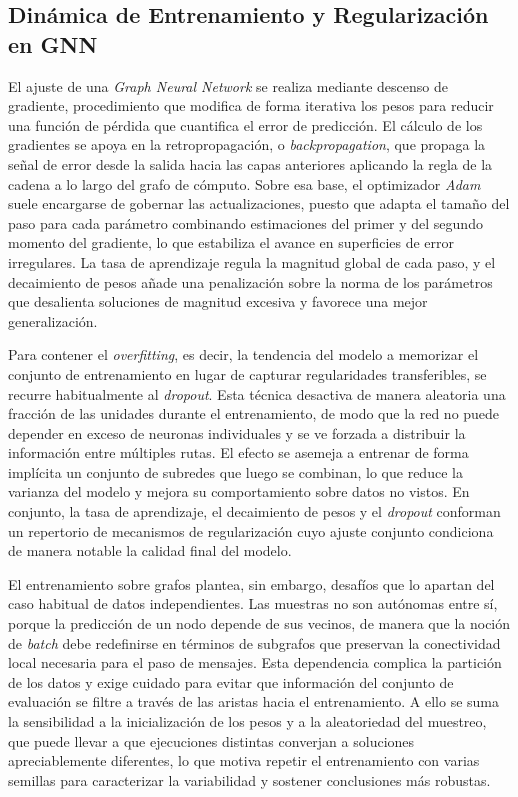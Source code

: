 \subsection{Dinámica de Entrenamiento y Regularización en GNN}

El ajuste de una \textit{Graph Neural Network} se realiza mediante descenso de gradiente, procedimiento que modifica de forma iterativa los pesos para reducir una función de pérdida que cuantifica el error de predicción. El cálculo de los gradientes se apoya en la retropropagación, o \textit{backpropagation}, que propaga la señal de error desde la salida hacia las capas anteriores aplicando la regla de la cadena a lo largo del grafo de cómputo. Sobre esa base, el optimizador \textit{Adam} suele encargarse de gobernar las actualizaciones, puesto que adapta el tamaño del paso para cada parámetro combinando estimaciones del primer y del segundo momento del gradiente, lo que estabiliza el avance en superficies de error irregulares. La tasa de aprendizaje regula la magnitud global de cada paso, y el decaimiento de pesos añade una penalización sobre la norma de los parámetros que desalienta soluciones de magnitud excesiva y favorece una mejor generalización.

Para contener el \textit{overfitting}, es decir, la tendencia del modelo a memorizar el conjunto de entrenamiento en lugar de capturar regularidades transferibles, se recurre habitualmente al \textit{dropout}. Esta técnica desactiva de manera aleatoria una fracción de las unidades durante el entrenamiento, de modo que la red no puede depender en exceso de neuronas individuales y se ve forzada a distribuir la información entre múltiples rutas. El efecto se asemeja a entrenar de forma implícita un conjunto de subredes que luego se combinan, lo que reduce la varianza del modelo y mejora su comportamiento sobre datos no vistos. En conjunto, la tasa de aprendizaje, el decaimiento de pesos y el \textit{dropout} conforman un repertorio de mecanismos de regularización cuyo ajuste conjunto condiciona de manera notable la calidad final del modelo.

El entrenamiento sobre grafos plantea, sin embargo, desafíos que lo apartan del caso habitual de datos independientes. Las muestras no son autónomas entre sí, porque la predicción de un nodo depende de sus vecinos, de manera que la noción de \textit{batch} debe redefinirse en términos de subgrafos que preservan la conectividad local necesaria para el paso de mensajes. Esta dependencia complica la partición de los datos y exige cuidado para evitar que información del conjunto de evaluación se filtre a través de las aristas hacia el entrenamiento. A ello se suma la sensibilidad a la inicialización de los pesos y a la aleatoriedad del muestreo, que puede llevar a que ejecuciones distintas converjan a soluciones apreciablemente diferentes, lo que motiva repetir el entrenamiento con varias semillas para caracterizar la variabilidad y sostener conclusiones más robustas.

